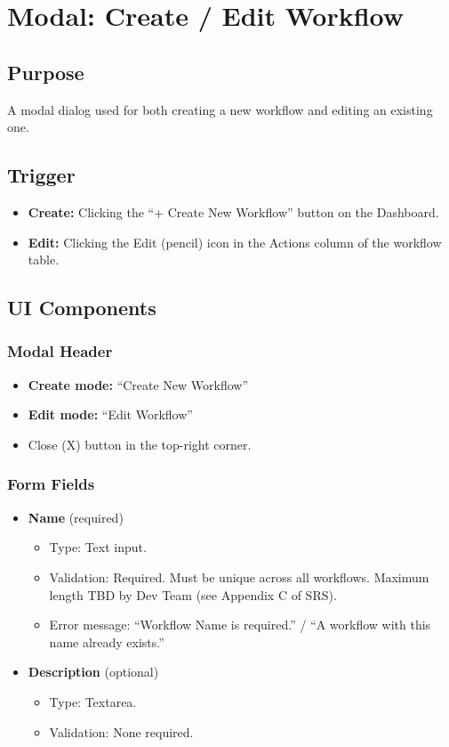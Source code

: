 \documentclass[12pt]{article}
\begin{document}
\section{Modal: Create / Edit Workflow}

\subsection{Purpose}
A modal dialog used for both creating a new workflow and editing an existing one.

\subsection{Trigger}
\begin{itemize}
    \item \textbf{Create:} Clicking the ``+ Create New Workflow'' button on the Dashboard.
    \item \textbf{Edit:} Clicking the Edit (pencil) icon in the Actions column of the
    workflow table.
\end{itemize}

\subsection{UI Components}

\subsubsection{Modal Header}
\begin{itemize}
    \item \textbf{Create mode:} ``Create New Workflow''
    \item \textbf{Edit mode:} ``Edit Workflow''
    \item Close (X) button in the top-right corner.
\end{itemize}

\subsubsection{Form Fields}
\begin{itemize}
    \item \textbf{Name} (required)
    \begin{itemize}
        \item Type: Text input.
        \item Validation: Required. Must be unique across all workflows. Maximum length TBD
        by Dev Team (see Appendix C of SRS).
        \item Error message: ``Workflow Name is required.'' / ``A workflow with this name
        already exists.''
    \end{itemize}
    \item \textbf{Description} (optional)
    \begin{itemize}
        \item Type: Textarea.
        \item Validation: None required.
    \end{itemize}
\end{itemize}
\end{document}
